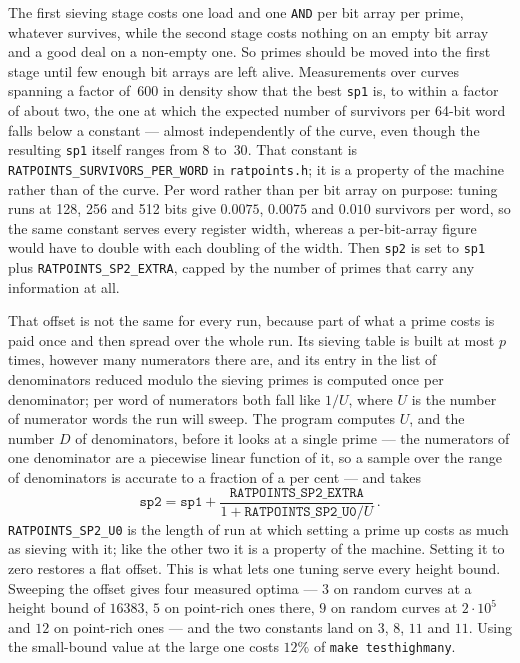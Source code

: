 \documentclass[12pt,a4paper,oneside]{amsart}
\begin{document}
The first sieving stage costs one load and one \texttt{AND} per bit array
per prime, whatever survives, while the second stage costs nothing on an
empty bit array and a good deal on a non-empty one. So primes should be moved
into the first stage until few enough bit arrays are left alive. Measurements
over curves spanning a factor of~$600$ in density show that the best
\texttt{sp1} is, to within a factor of about two, the one at which the
expected number of survivors per 64-bit word falls below a constant --- almost
independently of the curve, even though the resulting \texttt{sp1} itself
ranges from $8$ to~$30$. That constant is
\texttt{RATPOINTS\_SURVIVORS\_PER\_WORD} in \texttt{ratpoints.h}; it is a
property of the machine rather than of the curve. Per word rather than per bit
array on purpose: tuning runs at 128, 256 and 512 bits give $0.0075$, $0.0075$
and $0.010$ survivors per word, so the same constant serves every register
width, whereas a per-bit-array figure would have to double with each doubling
of the width. Then \texttt{sp2} is set to
\texttt{sp1} plus \texttt{RATPOINTS\_SP2\_EXTRA}, capped by the number of
primes that carry any information at all.

That offset is not the same for every run, because part of what a prime costs
is paid once and then spread over the whole run. Its sieving table is built
at most $p$ times, however many numerators there are, and its entry in the
list of denominators reduced modulo the sieving primes is computed once per
denominator; per word of numerators both fall like $1/U$, where $U$ is the
number of numerator words the run will sweep. The program computes $U$, and
the number $D$ of denominators, before it looks at a single prime --- the
numerators of one denominator are a piecewise linear function of it, so a
sample over the range of denominators is accurate to a fraction of a per cent
--- and takes
\[ \texttt{sp2} = \texttt{sp1}
   + \frac{\texttt{RATPOINTS\_SP2\_EXTRA}}{1 + \texttt{RATPOINTS\_SP2\_U0}/U} \,. \]
\texttt{RATPOINTS\_SP2\_U0} is the length of run at which setting a prime up
costs as much as sieving with it; like the other two it is a property of the
machine. Setting it to zero restores a flat offset. This is what lets one
tuning serve every height bound. Sweeping the offset gives four measured
optima --- $3$ on random curves at a height bound of $16383$, $5$ on
point-rich ones there, $9$ on random curves at $2\cdot 10^5$ and $12$ on
point-rich ones --- and the two constants land on $3$, $8$, $11$ and $11$.
Using the small-bound value at the large one costs $12\%$ of \texttt{make
testhighmany}.
\end{document}
